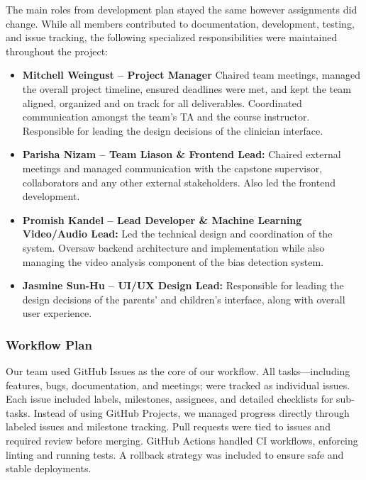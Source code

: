 \documentclass{article}
\begin{document}
\hspace{2em}The main roles from development plan stayed the same however assignments did change.
While all members contributed to documentation, development, testing, and issue tracking, the following specialized responsibilities were maintained throughout the project:

\begin{itemize}
    \item \textbf{Mitchell Weingust – Project Manager }  
    Chaired team meetings, managed the overall project timeline, ensured deadlines were met, and kept the team aligned, organized and on track for all deliverables. Coordinated communication amongst the team's TA and the course instructor.
    Responsible for leading the design decisions of the clinician interface.

    \item \textbf{Parisha Nizam – Team Liason \& Frontend Lead:}  
    Chaired external meetings and managed communication with the capstone supervisor, collaborators and any other external stakeholders. Also led the frontend development. 

    \item \textbf{Promish Kandel – Lead Developer \& Machine Learning Video/Audio Lead:}  
    Led the technical design and coordination of the system. Oversaw backend architecture and implementation while also managing the video analysis component of the bias detection system.

    \item \textbf{Jasmine Sun-Hu – UI/UX Design Lead:}  
    Responsible for leading the design decisions of the parents' and children's interface, along with overall user experience.
\end{itemize}

\subsubsection{Workflow Plan}

\hspace{2em}Our team used GitHub Issues as the core of our workflow. All tasks—including features, bugs, documentation, and meetings; were tracked as individual issues. 
Each issue included labels, milestones, assignees, and detailed checklists for sub-tasks. Instead of using GitHub Projects, we managed progress directly through labeled issues and milestone tracking. Pull requests were tied to issues and required review before merging. GitHub Actions handled CI workflows, enforcing linting and running tests. A rollback strategy was included to ensure safe and stable deployments.
\end{document}
